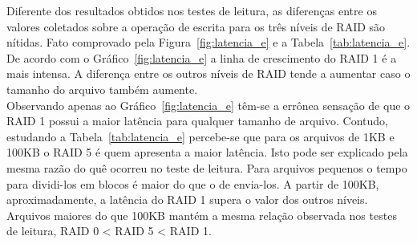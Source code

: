 	Diferente dos resultados obtidos nos testes de leitura, as diferenças entre os valores coletados sobre a operação de escrita para os três níveis de RAID são nítidas. Fato comprovado pela Figura~\ref{fig:latencia_e} e a Tabela~\ref{tab:latencia_e}.
	\\
	
	De acordo com o Gráfico~\ref{fig:latencia_e} a linha de crescimento do RAID 1 é a mais intensa. A diferença entre os outros níveis de RAID tende a aumentar caso o tamanho do arquivo também aumente.
	\\
	
	Observando apenas ao Gráfico~\ref{fig:latencia_e} têm-se a errônea sensação de que o RAID 1 possui a maior latência para qualquer tamanho de arquivo. Contudo, estudando a Tabela~\ref{tab:latencia_e} percebe-se que para os arquivos de 1KB e 100KB o RAID 5 é quem apresenta a maior latência. Isto pode ser explicado pela mesma razão do quê ocorreu no teste de leitura. Para arquivos pequenos o tempo para dividi-los em blocos é maior do que o de envia-los. A partir de 100KB, aproximadamente, a latência do RAID 1 supera o valor dos outros níveis. 
	\\
	
	Arquivos maiores do que 100KB mantém a mesma relação observada nos testes de leitura, RAID 0 < RAID 5 < RAID 1. 
	\\
	
